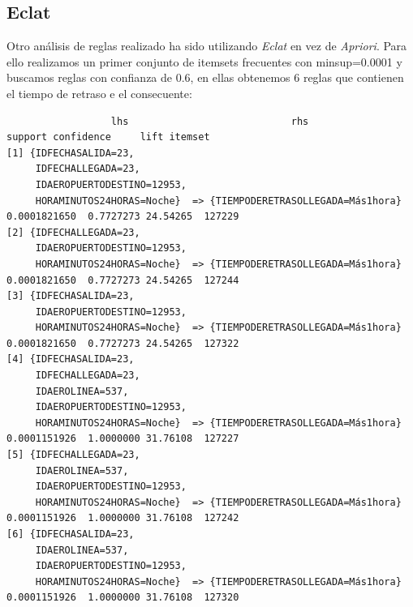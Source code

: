 \documentclass{article}
\begin{document}
\subsection{Eclat}
Otro análisis de reglas realizado ha sido utilizando \textit{Eclat} en vez de \textit{Apriori}. Para ello realizamos un primer conjunto de itemsets frecuentes con minsup=0.0001 y buscamos reglas con confianza de 0.6, en ellas obtenemos 6 reglas que contienen el tiempo de retraso e el consecuente:
\begin{lstlisting}
                  lhs                            rhs                                    support confidence     lift itemset
[1] {IDFECHASALIDA=23,                                                                                       
     IDFECHALLEGADA=23,                                                                                      
     IDAEROPUERTODESTINO=12953,                                                                              
     HORAMINUTOS24HORAS=Noche}  => {TIEMPODERETRASOLLEGADA=Más1hora} 0.0001821650  0.7727273 24.54265  127229
[2] {IDFECHALLEGADA=23,                                                                                      
     IDAEROPUERTODESTINO=12953,                                                                              
     HORAMINUTOS24HORAS=Noche}  => {TIEMPODERETRASOLLEGADA=Más1hora} 0.0001821650  0.7727273 24.54265  127244
[3] {IDFECHASALIDA=23,                                                                                       
     IDAEROPUERTODESTINO=12953,                                                                              
     HORAMINUTOS24HORAS=Noche}  => {TIEMPODERETRASOLLEGADA=Más1hora} 0.0001821650  0.7727273 24.54265  127322
[4] {IDFECHASALIDA=23,                                                                                       
     IDFECHALLEGADA=23,                                                                                      
     IDAEROLINEA=537,                                                                                        
     IDAEROPUERTODESTINO=12953,                                                                              
     HORAMINUTOS24HORAS=Noche}  => {TIEMPODERETRASOLLEGADA=Más1hora} 0.0001151926  1.0000000 31.76108  127227
[5] {IDFECHALLEGADA=23,                                                                                      
     IDAEROLINEA=537,                                                                                        
     IDAEROPUERTODESTINO=12953,                                                                              
     HORAMINUTOS24HORAS=Noche}  => {TIEMPODERETRASOLLEGADA=Más1hora} 0.0001151926  1.0000000 31.76108  127242
[6] {IDFECHASALIDA=23,                                                                                       
     IDAEROLINEA=537,                                                                                        
     IDAEROPUERTODESTINO=12953,                                                                              
     HORAMINUTOS24HORAS=Noche}  => {TIEMPODERETRASOLLEGADA=Más1hora} 0.0001151926  1.0000000 31.76108  127320
\end{lstlisting}
\end{document}
